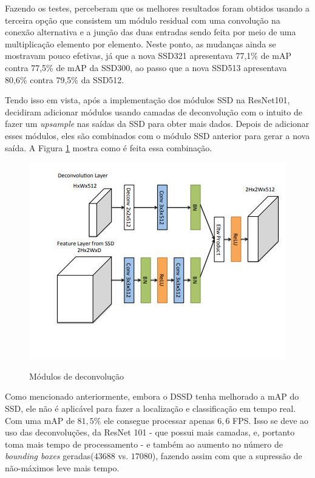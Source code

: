 Fazendo os testes,  perceberam que os melhores resultados foram obtidos usando a terceira opção que consistem um módulo residual com uma convolução na conexão alternativa e a junção das duas entradas sendo feita por meio de uma multiplicação elemento por elemento. Neste ponto, as mudanças ainda se mostravam pouco efetivas, já que a nova \ac{SSD}321 apresentava 77,1\% de \ac{mAP} contra 77,5\% de \ac{mAP} da \ac{SSD}300, ao passo que a nova \ac{SSD}513 apresentava 80,6\% contra 79,5\% da \ac{SSD}512.

Tendo isso em vista, após a implementação dos módulos \ac{SSD} na \ac{ResNet}101,  decidiram adicionar módulos usando camadas de deconvolução com o intuito de fazer um \textit{upsample} nas saídas da \ac{SSD} para obter mais dados. Depois de adicionar esses módulos, eles são combinados com o módulo \ac{SSD} anterior para gerar a nova saída. A Figura \ref{fig:deconv} mostra como é feita essa combinação.

\begin{figure}[H]
	\setlength{\abovecaptionskip}{0pt}
	\setlength{\belowcaptionskip}{0pt}
	\caption[Módulos de deconvolução]{Módulos de deconvolução}
	\centering
	\includegraphics[width=.6\textwidth]{imagem/0x_dssd-deconv.jpg}
	\captionsetup{justification=centering}
	\label{fig:deconv}
\end{figure}

Como mencionado anteriormente, embora o \ac{DSSD} tenha melhorado a \ac{mAP} do \ac{SSD}, ele não é aplicável para fazer a localização e classificação em tempo real. Com uma \ac{mAP} de $81,5\%$ ele consegue processar apenas $6,6$ \ac{FPS}. Isso se deve ao uso das deconvoluções, da ResNet 101 - que possui mais camadas, e, portanto toma mais tempo de processamento - e também ao aumento no número de \textit{bounding boxes} geradas($43688$ vs. $17080$), fazendo assim com que a supressão de não-máximos leve mais tempo.

